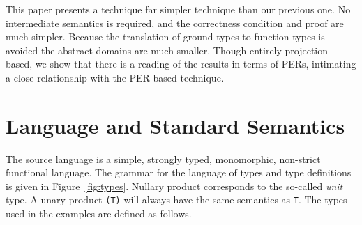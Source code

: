 This paper presents a technique far simpler technique than our previous
one.  No intermediate semantics is required, and the correctness
condition and proof are much simpler.  Because the translation of
ground types to function types is avoided the abstract domains are much
smaller. Though entirely projection-based, we show that there is a
reading of the results in terms of PERs, intimating a close
relationship with the PER-based technique.

\section{Language and Standard Semantics}
The source language is a simple, strongly typed, monomorphic,
non-strict functional language.  The grammar for the language
of types and type definitions is given in Figure~\ref{fig:types}.
Nullary product corresponds to the so-called {\it unit\/} type.  A unary
product \mbox{\tt (T)} will always have the same semantics as \mbox{\tt T}.
The types used in the examples are defined as follows.
\begin{flushleft}
\vspace{-0.0em}\vspace{-0.0em}\\
\vspace{-0.0em}\\
\makebox{\progsize\tt }\vspace{-0.0em}\\
\vspace{-0.0em}\\
\vspace{-0.0em}
\end{flushleft}


